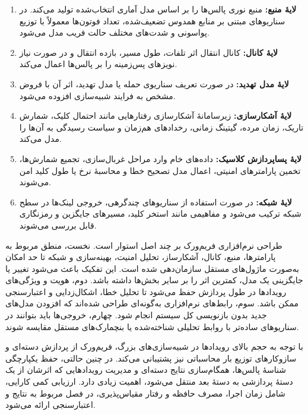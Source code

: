 \begin{enumerate}
	\item \textbf{لایهٔ منبع:} منبع نوری پالس‌ها را بر اساس مدل آماری انتخاب‌شده تولید می‌کند. در سناریوهای مبتنی بر منابع همدوس تضعیف‌شده، تعداد فوتون‌ها معمولاً با توزیع پواسونی و شدت‌های مختلف حالت فریب مدل می‌شود.
	
	\item \textbf{لایهٔ کانال:} کانال انتقال اثر تلفات، طول مسیر، بازده انتقال و در صورت نیاز نویزهای پس‌زمینه را بر پالس‌ها اعمال می‌کند.
	
	\item \textbf{لایهٔ مدل تهدید:} در صورت تعریف سناریوی حمله یا مدل تهدید، اثر آن با فروض مشخص به فرایند شبیه‌سازی افزوده می‌شود.
	
	\item \textbf{لایهٔ آشکارسازی:} زیرسامانهٔ آشکارسازی رفتارهایی مانند احتمال کلیک، شمارش تاریک، زمان مرده، گیتینگ زمانی، رخدادهای هم‌زمان و سیاست رسیدگی به آن‌ها را مدل می‌کند.
	
	\item \textbf{لایهٔ پساپردازش کلاسیک:} داده‌های خام وارد مراحل غربال‌سازی، تجمیع شمارش‌ها، تخمین پارامترهای امنیتی، اعمال مدل تصحیح خطا و محاسبهٔ نرخ یا طول کلید امن می‌شوند.
	
	\item \textbf{لایهٔ شبکه:} در صورت استفاده از سناریوهای چندگرهی، خروجی لینک‌ها در سطح شبکه ترکیب می‌شود و مفاهیمی مانند استخر کلید، مسیرهای جایگزین و رمزنگاری  قابل بررسی می‌شوند.
\end{enumerate}

طراحی نرم‌افزاری فریم‌ورک بر چند اصل استوار است. نخست، منطق مربوط به پارامترها، منبع، کانال، آشکارساز، تحلیل امنیت، بهینه‌سازی و شبکه تا حد امکان به‌صورت ماژول‌های مستقل سازمان‌دهی شده است. این تفکیک باعث می‌شود تغییر یا جایگزینی یک مدل، کمترین اثر را بر سایر بخش‌ها داشته باشد. دوم، هویت و ویژگی‌های رویدادها در طول پردازش حفظ می‌شود تا تحلیل خطا، اشکال‌زدایی و اعتبارسنجی ممکن باشد. سوم، رابط‌های نرم‌افزاری به‌گونه‌ای طراحی شده‌اند که افزودن مدل‌های جدید بدون بازنویسی کل سیستم انجام شود. چهارم، خروجی‌ها باید بتوانند در سناریوهای ساده‌تر با روابط تحلیلی شناخته‌شده یا بنچمارک‌های مستقل مقایسه شوند.

با توجه به حجم بالای رویدادها در شبیه‌سازی‌های بزرگ، فریم‌ورک از پردازش دسته‌ای و سازوکارهای توزیع بار محاسباتی نیز پشتیبانی می‌کند. در چنین حالتی، حفظ یکپارچگی شناسهٔ پالس‌ها، همگام‌سازی نتایج دسته‌ای و مدیریت رویدادهایی که اثرشان از یک دستهٔ پردازشی به دستهٔ بعد منتقل می‌شود، اهمیت زیادی دارد. ارزیابی کمی کارایی، شامل زمان اجرا، مصرف حافظه و رفتار مقیاس‌پذیری، در فصل مربوط به نتایج و اعتبارسنجی ارائه می‌شود.

